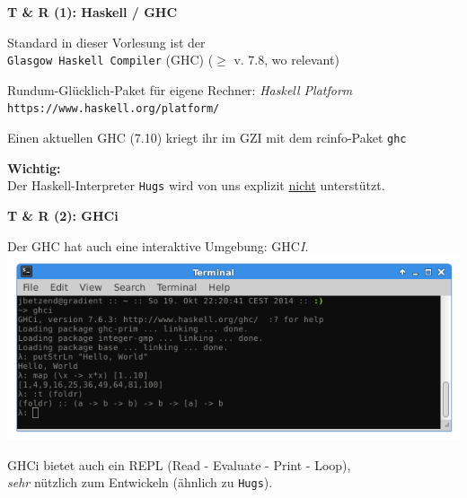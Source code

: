 \documentclass[unknownkeysallowed]{beamer}
\begin{document}
  
  \begin{frame}
    \begin{center}
    \Large\textbf{T \& R (1): Haskell / GHC}\\ \bigskip \normalsize
    
    Standard in dieser Vorlesung ist der  \\ \texttt{Glasgow Haskell Compiler} (GHC)
    ($\geqslant$ v. 7.8, wo relevant) \bigskip
    
    Rundum-Glücklich-Paket für eigene Rechner: \emph{Haskell Platform}\\
    \texttt{https://www.haskell.org/platform/}\bigskip
    
    Einen aktuellen GHC (7.10) kriegt ihr im GZI mit dem rcinfo-Paket \texttt{ghc} \smallskip
    
    \begin{important}
    \textbf{Wichtig:}\\ Der Haskell-Interpreter \texttt{Hugs} wird von uns explizit \underline{nicht} unterstützt.
    \end{important}
    \end{center}
  \end{frame}
  
  
  \begin{frame}
    \begin{center}
    \Large\textbf{T \& R (2): GHCi}\\ \bigskip \normalsize
    
    Der GHC hat auch eine interaktive Umgebung: GHC\emph{I}.\\\bigskip
    \includegraphics[scale=0.4]{ghci_example.png} 
    
    \bigskip GHCi bietet auch ein REPL (Read - Evaluate - Print - Loop),\\\emph{sehr} nützlich zum Entwickeln (ähnlich zu \texttt{Hugs}).
    \end{center}
  \end{frame}
  
\end{document}
